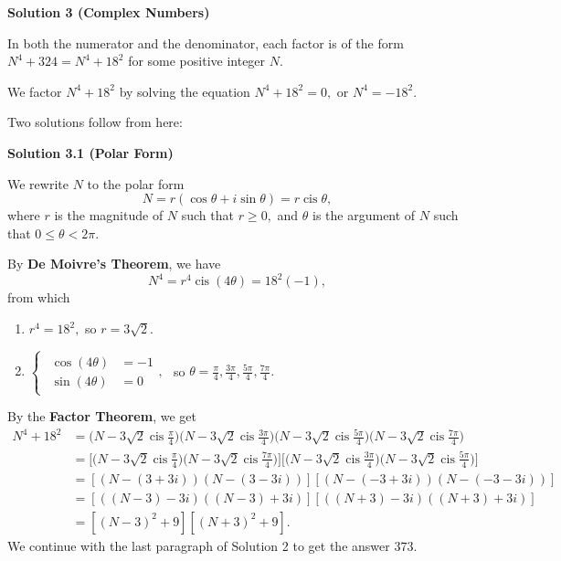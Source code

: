 \begin{enumerate}
 



\textbf{Solution 3 (Complex Numbers)}

In both the numerator and the denominator, each factor is of the form $N^4+324=N^4+18^2$ for some positive integer $N.$ 

 We factor $N^4+18^2$ by solving the equation $N^4+18^2=0,$ or $N^4=-18^2.$

 Two solutions follow from here:

 



\textbf{Solution 3.1 (Polar Form)}

We rewrite $N$ to the polar form 
 \[N=r(\cos\theta+i\sin\theta)=r\operatorname{cis}\theta,\] where $r$ is the magnitude of $N$ such that $r\geq0,$ and $\theta$ is the argument of $N$ such that $0\leq\theta<2\pi.$

 By \textbf{De Moivre's Theorem}, we have 
 \[N^4=r^4\operatorname{cis}(4\theta)=18^2(-1),\] from which

 
            \begin{enumerate} 
        \item $r^4=18^2,$ so $r=3\sqrt2.$

        \item $\begin{cases} \begin{aligned} \cos(4\theta) &= -1 \\ \sin(4\theta) &= 0 \end{aligned}, \end{cases}$ so $\theta=\frac{\pi}{4},\frac{3\pi}{4},\frac{5\pi}{4},\frac{7\pi}{4}.$

            \end{enumerate}
            By the \textbf{Factor Theorem}, we get
 \begin{align*} N^4+18^2&=\biggl(N-3\sqrt2\operatorname{cis}\frac{\pi}{4}\biggr)\biggl(N-3\sqrt2\operatorname{cis}\frac{3\pi}{4}\biggr)\biggl(N-3\sqrt2\operatorname{cis}\frac{5\pi}{4}\biggr)\biggl(N-3\sqrt2\operatorname{cis}\frac{7\pi}{4}\biggr) \\ &=\biggl[\biggl(N-3\sqrt2\operatorname{cis}\frac{\pi}{4}\biggr)\biggl(N-3\sqrt2\operatorname{cis}\frac{7\pi}{4}\biggr)\biggr]\biggl[\biggl(N-3\sqrt2\operatorname{cis}\frac{3\pi}{4}\biggr)\biggl(N-3\sqrt2\operatorname{cis}\frac{5\pi}{4}\biggr)\biggr] \\ &=\left[(N-(3+3i))(N-(3-3i))\right]\left[(N-(-3+3i))(N-(-3-3i))\right] \\ &=\left[((N-3)-3i)((N-3)+3i)\right]\left[((N+3)-3i)((N+3)+3i)\right] \\ &=\left[(N-3)^2+9\right]\left[(N+3)^2+9\right]. \end{align*}
We continue with the last paragraph of Solution 2 to get the answer $\boxed{373}.$





\end{enumerate}
